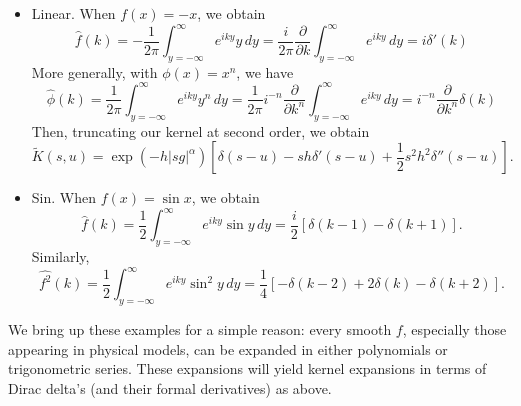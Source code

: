 \documentclass[12pt]{l4dc2021}
\begin{document}
\begin{itemize}
\item Linear.  When $f(x) = -x$, we obtain 
\begin{equation}
 \label{eqn:ft1}
\widehat{f}(k) = - \frac{1}{2 \pi} \int_{y=-\infty}^\infty e^{i k y} y \, dy = \frac{i}{2 \pi} \frac{\partial}{\partial k} \int_{y=-\infty}^\infty e^{i k y} \, dy = i \delta'(k)
 \end{equation}
More generally, with $\phi(x) = x^n$, we have
\begin{equation}
 \label{eqn:ftx}
\widehat{\phi}(k) = \frac{1}{2 \pi} \int_{y=-\infty}^\infty e^{i k y} y^n \, dy = \frac{1}{2 \pi} i^{-n} \frac{\partial}{\partial k^n} \int_{y=-\infty}^\infty e^{i k y} \, dy = i^{-n} \frac{\partial}{\partial k^n} \delta(k)
 \end{equation}
 Then, truncating our kernel at second order, we obtain
\[
\widetilde{K}(s,u) =  \exp{\left(  -h |s g|^{\alpha} \right)} \left[ \delta(s-u) - s h \delta'(s-u) + \frac{1}{2} s^2 h^2 \delta''(s-u) \right].
\]
\item Sin. When $f(x) = \sin x$, we obtain
\begin{equation}
\label{eqn:sinhat}
\widehat{f}(k) = \frac{1}{2} \int_{y=-\infty}^\infty e^{i k y} \sin y \, dy = \frac{i}{2} \left[ \delta(k-1) - \delta(k+1) \right].
\end{equation}
Similarly,
\begin{equation}
\label{eqn:sinsqhat}
\widehat{f^2}(k) = \frac{1}{2} \int_{y=-\infty}^\infty e^{i k y} \sin^2 y \, dy = \frac{1}{4} \left[ -\delta(k-2) + 2 \delta(k) - \delta(k+2) \right].
\end{equation}
\end{itemize}
We bring up these examples for a simple reason: every smooth $f$, especially those appearing in physical models, can be expanded in either polynomials or trigonometric series.  These expansions will yield kernel expansions in terms of Dirac delta's (and their formal derivatives) as above.

\end{document}
